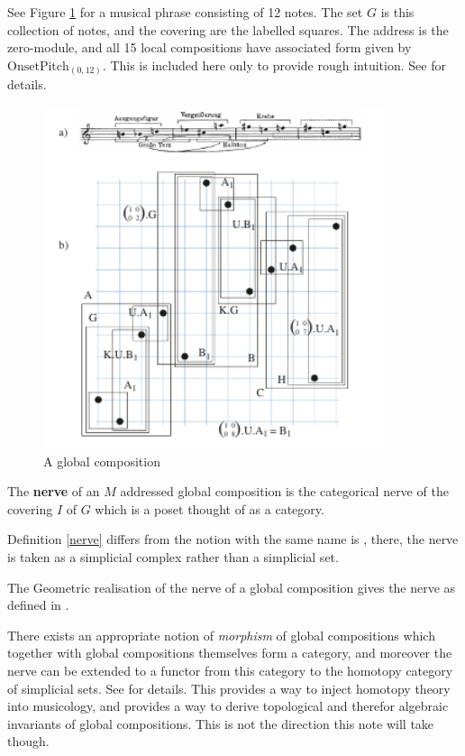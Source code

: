 \begin{example}
 See Figure \ref{Boulez} for a musical phrase consisting of 12 notes. The set $G$ is this collection of notes, and the covering are the labelled squares. The address is the zero-module, and all 15 local compositions have associated form given by $\operatorname{OnsetPitch_{(0,12)}}$. This is included here only to provide rough intuition. See \cite[\S13.2]{Mazzola} for details.
 \begin{figure}[h]
 \centering
 \label{Boulez}
 \includegraphics[width = 10cm]{Pictures/Boulez.png}
 \caption{A global composition}
\end{figure}
\end{example}
\begin{defn}
\label{nerve}
 The \textbf{nerve} of an $M$ addressed global composition is the categorical nerve of the covering $I$ of $G$ which is a poset thought of as a category.
\end{defn}
\begin{remark}
 Definition \ref{nerve} differs from the notion with the same name is \cite{Mazzola}, there, the nerve is taken as a simplicial complex rather than a simplicial set.
\end{remark}
\begin{lemma}
 The Geometric realisation of the nerve of a global composition gives the nerve as defined in \cite[\S13.2.1]{Mazzola}.
\end{lemma}
\begin{remark}
 There exists an appropriate notion of \emph{morphism} of global compositions which together with global compositions themselves form a category, and moreover the nerve can be extended to a functor from this category to the homotopy category of simplicial sets. See \cite[\S13,\S14]{Mazzola} for details. This provides a way to inject homotopy theory into musicology, and provides a way to derive topological and therefor algebraic invariants of global compositions. This is not the direction this note will take though.
\end{remark}
